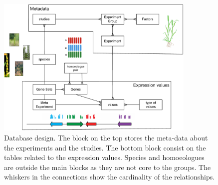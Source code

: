 \begin{figure}
\centering
\includegraphics[width=0.85\textwidth]{expVIP/Figures/dbDesign.pdf}
\caption[expVIP database design]{Database design. The block on the top stores the meta-data about the experiments and the studies. The bottom block consist on the tables related to the expression values. Species and homoeologues are outside the main blocks as they are not core to the groups. The whiskers in the connections show the cardinality of the relationships.}
\label{fig:expvip:dbDesign}
\end{figure}

